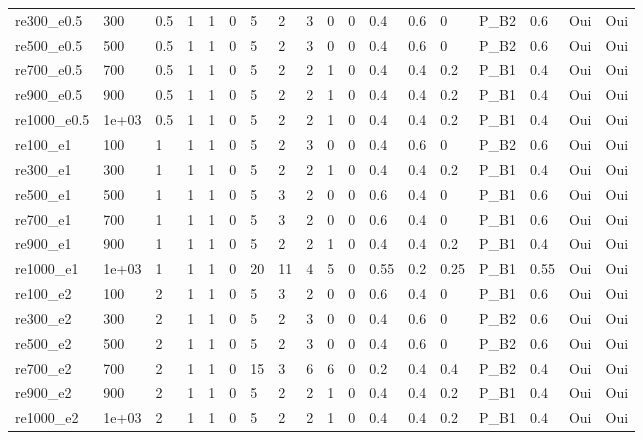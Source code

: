 \documentclass[11pt,a4paper]{article}
\begin{document}
\begin{landscape}
\begin{longtable}{*{18}{l}}
    re300\_e0.5 & 300 & 0.5 & 1 & 1 & 0 & 5 & 2 & 3 & 0 & 0 & 0.4 & 0.6 & 0 & P\_B2 & 0.6 & Oui & Oui \\
    re500\_e0.5 & 500 & 0.5 & 1 & 1 & 0 & 5 & 2 & 3 & 0 & 0 & 0.4 & 0.6 & 0 & P\_B2 & 0.6 & Oui & Oui \\
    re700\_e0.5 & 700 & 0.5 & 1 & 1 & 0 & 5 & 2 & 2 & 1 & 0 & 0.4 & 0.4 & 0.2 & P\_B1 & 0.4 & Oui & Oui \\
    re900\_e0.5 & 900 & 0.5 & 1 & 1 & 0 & 5 & 2 & 2 & 1 & 0 & 0.4 & 0.4 & 0.2 & P\_B1 & 0.4 & Oui & Oui \\
    re1000\_e0.5 & 1e+03 & 0.5 & 1 & 1 & 0 & 5 & 2 & 2 & 1 & 0 & 0.4 & 0.4 & 0.2 & P\_B1 & 0.4 & Oui & Oui \\
    re100\_e1 & 100 & 1 & 1 & 1 & 0 & 5 & 2 & 3 & 0 & 0 & 0.4 & 0.6 & 0 & P\_B2 & 0.6 & Oui & Oui \\
    re300\_e1 & 300 & 1 & 1 & 1 & 0 & 5 & 2 & 2 & 1 & 0 & 0.4 & 0.4 & 0.2 & P\_B1 & 0.4 & Oui & Oui \\
    re500\_e1 & 500 & 1 & 1 & 1 & 0 & 5 & 3 & 2 & 0 & 0 & 0.6 & 0.4 & 0 & P\_B1 & 0.6 & Oui & Oui \\
    re700\_e1 & 700 & 1 & 1 & 1 & 0 & 5 & 3 & 2 & 0 & 0 & 0.6 & 0.4 & 0 & P\_B1 & 0.6 & Oui & Oui \\
    re900\_e1 & 900 & 1 & 1 & 1 & 0 & 5 & 2 & 2 & 1 & 0 & 0.4 & 0.4 & 0.2 & P\_B1 & 0.4 & Oui & Oui \\
    re1000\_e1 & 1e+03 & 1 & 1 & 1 & 0 & 20 & 11 & 4 & 5 & 0 & 0.55 & 0.2 & 0.25 & P\_B1 & 0.55 & Oui & Oui \\
    re100\_e2 & 100 & 2 & 1 & 1 & 0 & 5 & 3 & 2 & 0 & 0 & 0.6 & 0.4 & 0 & P\_B1 & 0.6 & Oui & Oui \\
    re300\_e2 & 300 & 2 & 1 & 1 & 0 & 5 & 2 & 3 & 0 & 0 & 0.4 & 0.6 & 0 & P\_B2 & 0.6 & Oui & Oui \\
    re500\_e2 & 500 & 2 & 1 & 1 & 0 & 5 & 2 & 3 & 0 & 0 & 0.4 & 0.6 & 0 & P\_B2 & 0.6 & Oui & Oui \\
    re700\_e2 & 700 & 2 & 1 & 1 & 0 & 15 & 3 & 6 & 6 & 0 & 0.2 & 0.4 & 0.4 & P\_B2 & 0.4 & Oui & Oui \\
    re900\_e2 & 900 & 2 & 1 & 1 & 0 & 5 & 2 & 2 & 1 & 0 & 0.4 & 0.4 & 0.2 & P\_B1 & 0.4 & Oui & Oui \\
    re1000\_e2 & 1e+03 & 2 & 1 & 1 & 0 & 5 & 2 & 2 & 1 & 0 & 0.4 & 0.4 & 0.2 & P\_B1 & 0.4 & Oui & Oui \\
    \end{longtable}
\endgroup
\end{landscape}
\end{document}
